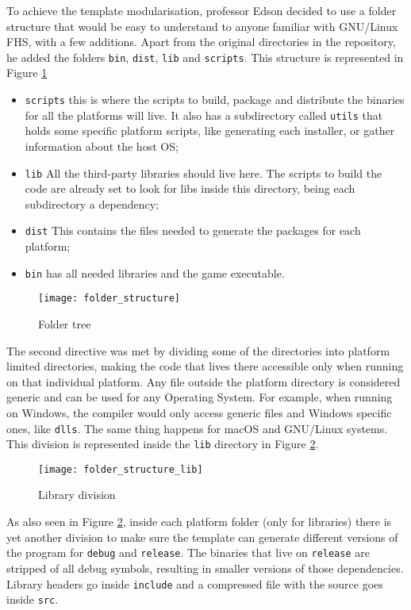 To achieve the template modularisation, professor Edson decided to use a folder structure that would be easy to understand to anyone familiar with GNU/Linux FHS, with a few additions. Apart from the original directories in the repository, he added the folders \texttt{bin}, \texttt{dist}, \texttt{lib} and \texttt{scripts}. This structure is represented in Figure \ref{fig:folder_structure}

\begin{itemize}
\item \texttt{scripts} this is where the scripts to build, package and distribute the binaries for all the platforms will live. It also has a subdirectory called \texttt{utils} that holds some specific platform scripts, like generating each installer, or gather information about the host OS;
\item \texttt{lib} All the third-party libraries should live here. The scripts to build the code are already set to look for libs inside this directory, being each subdirectory a dependency;
\item \texttt{dist} This contains the files needed to generate the packages for each platform;
\item \texttt{bin} has all needed libraries and the game executable.

\end{itemize}

\begin{figure}[h!]
\centering
\texttt{[image: folder\_structure]}
\caption{Folder tree}
\label{fig:folder_structure}
\end{figure}

The second directive was met by dividing some of the directories into platform limited directories, making the code that lives there accessible only when running on that individual platform. Any file outside the platform directory is considered generic and can be used for any Operating System. For example, when running on Windows, the compiler would only access generic files and Windows specific ones, like \texttt{dlls}. The same thing happens for macOS and GNU/Linux systems. This division is represented inside the \texttt{lib} directory in Figure \ref{fig:folder_structure_lib}.

\begin{figure}[h!]
\centering
\texttt{[image: folder\_structure\_lib]}
\caption{Library division}
\label{fig:folder_structure_lib}
\end{figure}

As also seen in Figure \ref{fig:folder_structure_lib}, inside each platform folder (only for libraries) there is yet another division to make sure the template can generate different versions of the program for \texttt{debug} and \texttt{release}. The binaries that live on \texttt{release} are stripped of all debug symbols, resulting in smaller versions of those dependencies. Library headers go inside \texttt{include} and a compressed file with the source goes inside \texttt{src}.


